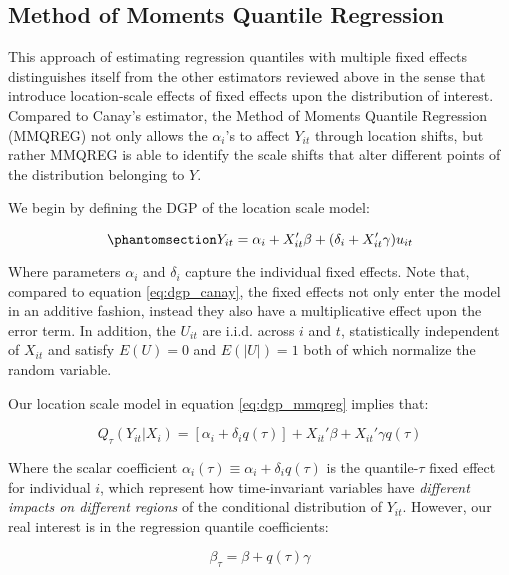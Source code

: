 \documentclass[bib]{statapress}
\begin{document}
\subsection{\texorpdfstring{Method of Moments Quantile Regression
\citet{mss2019}}{Method of Moments Quantile Regression @mss2019}}\label{sec-mmqr}

This approach of estimating regression quantiles with multiple fixed
effects distinguishes itself from the other estimators reviewed above in
the sense that \citep{mss2019} introduce location-scale effects of fixed
effects upon the distribution of interest. Compared to Canay's
estimator, the Method of Moments Quantile Regression (MMQREG) not only
allows the \(\alpha_i\)'s to affect \(Y_{it}\) through location shifts,
but rather MMQREG is able to identify the scale shifts that alter
different points of the distribution belonging to \(Y\).

We begin by defining the DGP of the location scale model:

\begin{equation}\phantomsection\label{eq-dgp_mmqreg}{Y_{it} = \alpha_i + X_{it}' \beta + (\delta_i + X_{it}' \gamma) u_{it}
}\end{equation}

Where parameters \(\alpha_i\) and \(\delta_i\) capture the individual
fixed effects. Note that, compared to equation
\hyperref[eq:dgp_canay]{{[}eq:dgp\_canay{]}}, the fixed effects not only
enter the model in an additive fashion, instead they also have a
multiplicative effect upon the error term. In addition, the \(U_{it}\)
are i.i.d. across \(i\) and \(t\), statistically independent of
\(X_{it}\) and satisfy \(E(U) = 0\) and \(E(|U|) = 1\) both of which
normalize the random variable.

Our location scale model in equation
\hyperref[eq:dgp_mmqreg]{{[}eq:dgp\_mmqreg{]}} implies that:

\[\label{eq:mmqreg_quantile}
    Q_{\tau}(Y_{it}|X_i) = [\alpha_i + \delta_i q(\tau)] + X_{it}' \beta + X_{it}' \gamma q(\tau)\]

Where the scalar coefficient
\(\alpha_i(\tau) \equiv \alpha_i + \delta_i q(\tau)\) is the
quantile-\(\tau\) fixed effect for individual \(i\), which represent how
time-invariant variables have \emph{different impacts on different
regions} of the conditional distribution of \(Y_{it}\). However, our
real interest is in the regression quantile coefficients:

\[\label{eq:rqcoefficients_mmqreg}
    \beta_{\tau} = \beta + q(\tau) \gamma\]
\end{document}
